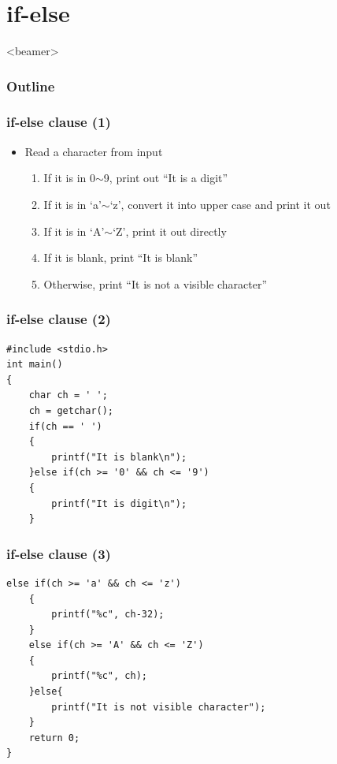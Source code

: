 \section{if-else}
\label{sec:if}
\begin{frame}<beamer>
    \frametitle{Outline}
    \tableofcontents[currentsection]
\end{frame}


\begin{frame}\frametitle{if-else clause (1)}
\begin{itemize}
	\item {Read a character from input}
	\begin{enumerate}
		\item {If it is in 0$\sim$9, print out ``It is a digit''}
		\item {If it is in `a'$\sim$`z', convert it into upper case and print it out}
		\item {If it is in `A'$\sim$`Z', print it out directly}
		\item {If it is blank, print ``It is blank''}
		\item {Otherwise, print ``It is not a visible character''}
	\end{enumerate}
\end{itemize}
\end{frame}

\ifx\answer\undefined
\begin{frame}[fragile]\frametitle{if-else clause (2)}
\begin{lstlisting}[basicstyle=\large]
#include <stdio.h>
int main()
{
    char ch = ' ';
    ch = getchar();
    if(ch == ' ')
    {
        printf("It is blank\n");
    }else if(ch >= '0' && ch <= '9')
    {
        printf("It is digit\n");
    }
\end{lstlisting}
\end{frame}

\begin{frame}[fragile]\frametitle{if-else clause (3)}
\begin{lstlisting}[basicstyle=\large,firstnumber=13]
    else if(ch >= 'a' && ch <= 'z')
    {
        printf("%c", ch-32);
    }    
    else if(ch >= 'A' && ch <= 'Z')
    {
        printf("%c", ch);
    }else{
        printf("It is not visible character");
    }
    return 0;
}
\end{lstlisting}
\end{frame}
\fi

